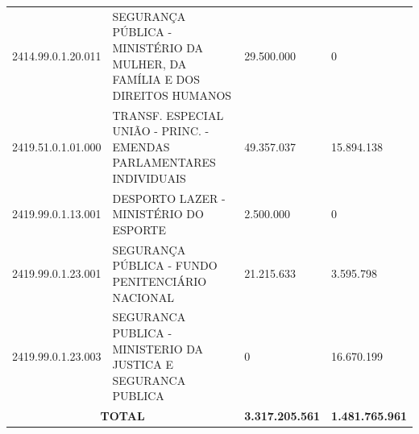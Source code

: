 \documentclass{article}
\begin{document}
\begin{longtable}[c]{m{2cm}|m{11cm}|m{2cm}m{2cm}}
\multicolumn{1}{C{2cm}|}{2414.99.0.1.20.011} & \multicolumn{1}{L{11cm}|}{SEGURANÇA PÚBLICA - MINISTÉRIO DA MULHER, DA FAMÍLIA E DOS DIREITOS HUMANOS} & \multicolumn{1}{R{2cm}|}{29.500.000} & \multicolumn{1}{R{2cm}}{            0} \\
\multicolumn{1}{C{2cm}|}{2419.51.0.1.01.000} & \multicolumn{1}{L{11cm}|}{TRANSF. ESPECIAL UNIÃO - PRINC. - EMENDAS PARLAMENTARES INDIVIDUAIS} & \multicolumn{1}{R{2cm}|}{49.357.037} & \multicolumn{1}{R{2cm}}{15.894.138} \\
\multicolumn{1}{C{2cm}|}{2419.99.0.1.13.001} & \multicolumn{1}{L{11cm}|}{DESPORTO LAZER - MINISTÉRIO DO ESPORTE} & \multicolumn{1}{R{2cm}|}{2.500.000} & \multicolumn{1}{R{2cm}}{            0} \\
\multicolumn{1}{C{2cm}|}{2419.99.0.1.23.001} & \multicolumn{1}{L{11cm}|}{SEGURANÇA PÚBLICA - FUNDO PENITENCIÁRIO NACIONAL} & \multicolumn{1}{R{2cm}|}{21.215.633} & \multicolumn{1}{R{2cm}}{3.595.798} \\
\multicolumn{1}{C{2cm}|}{2419.99.0.1.23.003} & \multicolumn{1}{L{11cm}|}{SEGURANCA PUBLICA - MINISTERIO DA JUSTICA E SEGURANCA PUBLICA} & \multicolumn{1}{R{2cm}|}{            0} & \multicolumn{1}{R{2cm}}{16.670.199} \\
\hline
\multicolumn{2}{c|}{ \textbf{TOTAL}} & \multicolumn{1}{R{2cm}|}{ \textbf{3.317.205.561}} & \multicolumn{1}{R{2cm}}{ \textbf{1.481.765.961}} \\\hline\hline\end{longtable}\raggedright\fontsize{7pt}{10pt}\selectfont {Fonte: PPO.} \\\fontsize{7pt}{10pt}\selectfont {ELABORAÇÃO: DCAF/SCPPO/SEPLAG}\\\fontsize{7pt}{10pt}\selectfont {Nota: Foi considerado o valor da receita efetivada até o mês de Agosto/2026}\\\fontsize{7pt}{10pt}\selectfont {Na elaboração desse relatório foram consideradas as fontes de recurso 1, 2, 3, 4, 5, 6, 7, 8, 16, 17, 21, 24, 36, 37, 38, 56, 57, 62, 63, 64, 65, 73, 92, 93, 97 e 98.}\\
\end{document}
